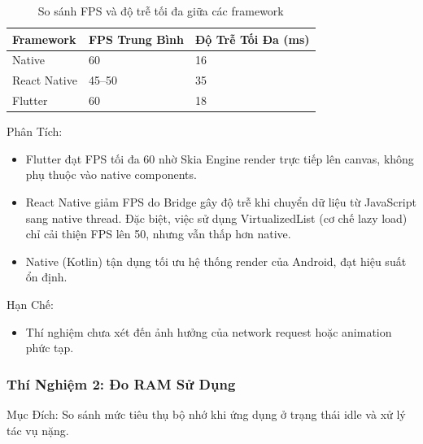 \vspace{0.5em}

\begin{table}[H]
  \centering
  \begin{tabular}{|l|p{5cm}|p{5cm}|}
  \hline
  \textbf{Framework} & \textbf{FPS Trung Bình} & \textbf{Độ Trễ Tối Đa (ms)} \\
  \hline
  Native       & 60          & 16 \\
  React Native & 45--50      & 35 \\
  Flutter      & 60          & 18 \\
  \hline
  \end{tabular}
  \caption{So sánh FPS và độ trễ tối đa giữa các framework}
  \end{table}
  
\begin{flushleft}
  \hspace*{0.8cm}Phân Tích:
  \setlength{\leftmargini}{1.5cm}
  \begin{itemize}
      \item Flutter đạt FPS tối đa 60 nhờ Skia Engine render trực tiếp lên canvas, không phụ thuộc vào native components.
      \item React Native giảm FPS do Bridge gây độ trễ khi chuyển dữ liệu từ JavaScript sang native thread. Đặc biệt, việc sử dụng VirtualizedList (cơ chế lazy load) chỉ cải thiện FPS lên 50, nhưng vẫn thấp hơn native.
      \item Native (Kotlin) tận dụng tối ưu hệ thống render của Android, đạt hiệu suất ổn định.
  \end{itemize}
\end{flushleft}

\begin{flushleft}
  \hspace*{0.8cm}Hạn Chế:
  \setlength{\leftmargini}{1.5cm}
  \begin{itemize}
      \item Thí nghiệm chưa xét đến ảnh hưởng của network request hoặc animation phức tạp.
  \end{itemize}
\end{flushleft}

\subsubsection{Thí Nghiệm 2: Đo RAM Sử Dụng}
    \begin{flushleft}
      \hspace*{0.8cm}Mục Đích: So sánh mức tiêu thụ bộ nhớ khi ứng dụng ở trạng thái idle và xử lý tác vụ nặng.
    \end{flushleft}

